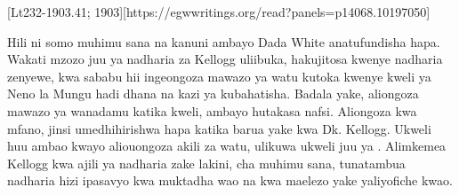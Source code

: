 [Lt232-1903.41; 1903][https://egwwritings.org/read?panels=p14068.10197050]


Hili ni somo muhimu sana na kanuni ambayo Dada White anatufundisha hapa. Wakati mzozo juu ya nadharia za Kellogg uliibuka, hakujitosa kwenye nadharia zenyewe, kwa sababu hii ingeongoza mawazo ya watu kutoka kwenye kweli ya Neno la Mungu hadi dhana na kazi ya kubahatisha. Badala yake, aliongoza mawazo ya wanadamu katika kweli, ambayo hutakasa nafsi. Aliongoza kwa mfano, jinsi umedhihirishwa hapa katika barua yake kwa Dk. Kellogg. Ukweli huu ambao kwayo aliouongoza akili za watu, ulikuwa ukweli juu ya . Alimkemea Kellogg kwa ajili ya nadharia zake lakini, cha muhimu sana, tunatambua nadharia hizi ipasavyo kwa muktadha wao na kwa maelezo yake yaliyofiche kwao.


